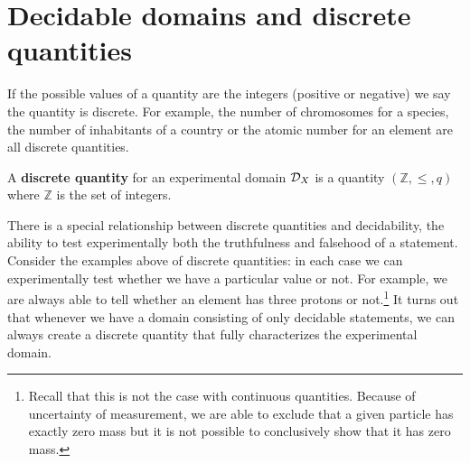 \documentclass[11pt,letterpaper,fleqn]{memoir} %
\begin{document}
\section{Decidable domains and discrete quantities}

If the possible values of a quantity are the integers (positive or negative) we say the quantity is discrete. For example, the number of chromosomes for a species, the number of inhabitants of a country or the atomic number for an element are all discrete quantities.

\begin{mathSection}
	\begin{defn}
		A \textbf{discrete quantity} for an experimental domain $\mathcal{D}_X$ is a quantity $(\mathbb{Z}, \leq, q)$ where $\mathbb{Z}$ is the set of integers.
	\end{defn}
\end{mathSection}

There is a special relationship between discrete quantities and decidability, the ability to test experimentally both the truthfulness and falsehood of a statement. Consider the examples above of discrete quantities: in each case we can experimentally test whether we have a particular value or not. For example, we are always able to tell whether an element has three protons or not.\footnote{Recall that this is not the case with continuous quantities. Because of uncertainty of measurement, we are able to exclude that a given particle has exactly zero mass but it is not possible to conclusively show that it has zero mass.} It turns out that whenever we have a domain consisting of only decidable statements, we can always create a discrete quantity that fully characterizes the experimental domain.

\end{document}
